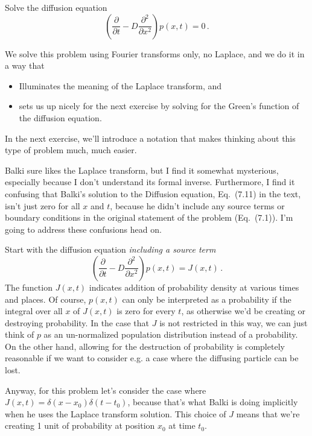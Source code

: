 

Solve the diffusion equation
\begin{equation*}
  \left( \frac{\partial}{\partial t} - D \frac{\partial^2}{\partial x^2} \right) p(x, t) = 0 \, .
\end{equation*}


We solve this problem using Fourier transforms only, no Laplace, and we do it in a way that
\begin{itemize}
    \item Illuminates the meaning of the Laplace transform, and
    \item sets us up nicely for the next exercise by solving for the Green's function of the diffusion equation.
\end{itemize}
In the next exercise, we'll introduce a notation that makes thinking about this type of problem much, much easier.

Balki sure likes the Laplace transform, but I find it somewhat mysterious, especially because I don't understand its formal inverse.
Furthermore, I find it confusing that Balki's solution to the Diffusion equation, Eq.~(7.11) in the text, isn't just zero for all $x$ and $t$, because he didn't include any source terms or boundary conditions in the original statement of the problem (Eq.~(7.1)).
I'm going to address these confusions head on.

Start with the diffusion equation \emph{including a source term}
\begin{equation*}
  \left( \frac{\partial}{\partial t} - D \frac{\partial^2}{\partial x^2} \right) p(x, t) = J(x, t) \, .
\end{equation*}
The function $J(x,t)$ indicates addition of probability density at various times and places.
Of course, $p(x, t)$ can only be interpreted as a probability if the integral over all $x$ of $J(x, t)$ is zero for every $t$, as otherwise we'd be creating or destroying probability.
In the case that $J$ is not restricted in this way, we can just think of $p$ as an un-normalized population distribution instead of a probability.
On the other hand, allowing for the destruction of probability is completely reasonable if we want to consider e.g. a case where the diffusing particle can be lost.

Anyway, for this problem let's consider the case where $J(x, t) = \delta(x - x_0) \delta(t - t_0)$, because that's what Balki is doing implicitly when he uses the Laplace transform solution.
This choice of $J$ means that we're creating 1 unit of probability at position $x_0$ at time $t_0$.

